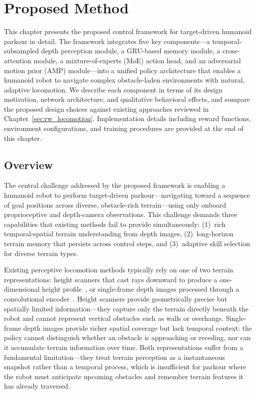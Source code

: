 \chapter{Proposed Method}
\label{chap:proposed_method}

This chapter presents the proposed control framework for target-driven humanoid parkour in detail. The framework integrates five key components---a temporal-subsampled depth perception module, a GRU-based memory module, a cross-attention module, a mixture-of-experts (MoE) action head, and an adversarial motion prior (AMP) module---into a unified policy architecture that enables a humanoid robot to navigate complex obstacle-laden environments with natural, adaptive locomotion. We describe each component in terms of its design motivation, network architecture, and qualitative behavioral effects, and compare the proposed design choices against existing approaches reviewed in Chapter~\ref{sec:rw_locomotion}. Implementation details including reward functions, environment configurations, and training procedures are provided at the end of this chapter.

\section{Overview}
\label{sec:method_overview}

The central challenge addressed by the proposed framework is enabling a humanoid robot to perform target-driven parkour---navigating toward a sequence of goal positions across diverse, obstacle-rich terrain---using only onboard proprioceptive and depth-camera observations. This challenge demands three capabilities that existing methods fail to provide simultaneously: (1)~rich temporal-spatial terrain understanding from depth images, (2)~long-horizon terrain memory that persists across control steps, and (3)~adaptive skill selection for diverse terrain types.

Existing perceptive locomotion methods typically rely on one of two terrain representations: height scanners that cast rays downward to produce a one-dimensional height profile~\cite{zhang2024rpl,cheng2024extremeparkour}, or single-frame depth images processed through a convolutional encoder~\cite{zhu2024hiking,zhuang2024humanoidparkour}. Height scanners provide geometrically precise but spatially limited information---they capture only the terrain directly beneath the robot and cannot represent vertical obstacles such as walls or overhangs. Single-frame depth images provide richer spatial coverage but lack temporal context: the policy cannot distinguish whether an obstacle is approaching or receding, nor can it accumulate terrain information over time. Both representations suffer from a fundamental limitation---they treat terrain perception as a instantaneous snapshot rather than a temporal process, which is insufficient for parkour where the robot must anticipate upcoming obstacles and remember terrain features it has already traversed.

